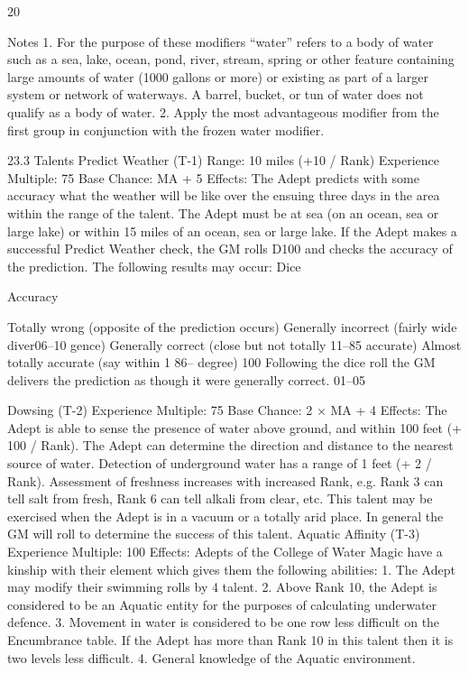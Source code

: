 \documentclass[a4paper]{article}
\begin{document}
\begin{multicols}{3}
20

Notes
1. For the purpose of these modifiers “water” refers
to a body of water such as a sea, lake, ocean, pond,
river, stream, spring or other feature containing
large amounts of water (1000 gallons or more) or
existing as part of a larger system or network of
waterways. A barrel, bucket, or tun of water does
not qualify as a body of water.
2. Apply the most advantageous modifier from the
first group in conjunction with the frozen water
modifier.

23.3 Talents
Predict Weather (T-1)
Range: 10 miles (+10 / Rank)
Experience Multiple: 75
Base Chance: MA + 5%
Effects: The Adept predicts with some accuracy
what the weather will be like over the ensuing
three days in the area within the range of the talent.
The Adept must be at sea (on an ocean, sea or large
lake) or within 15 miles of an ocean, sea or large
lake. If the Adept makes a successful Predict
Weather check, the GM rolls D100 and checks the
accuracy of the prediction. The following results
may occur:
Dice

Accuracy

Totally wrong (opposite of the prediction
occurs)
Generally incorrect (fairly wide diver06–10
gence)
Generally correct (close but not totally
11–85
accurate)
Almost totally accurate (say within 1
86–
degree)
100
Following the dice roll the GM delivers the prediction as though it were generally correct.
01–05

Dowsing (T-2)
Experience Multiple: 75
Base Chance: 2 × MA + 4%
Effects: The Adept is able to sense the presence of
water above ground, and within 100 feet (+ 100 /
Rank). The Adept can determine the direction and
distance to the nearest source of water. Detection
of underground water has a range of 1 feet (+ 2 /
Rank). Assessment of freshness increases with
increased Rank, e.g. Rank 3 can tell salt from
fresh, Rank 6 can tell alkali from clear, etc. This
talent may be exercised when the Adept is in a
vacuum or a totally arid place. In general the GM
will roll to determine the success of this talent.
Aquatic Affinity (T-3)
Experience Multiple: 100
Effects: Adepts of the College of Water Magic
have a kinship with their element which gives them
the following abilities:
1. The Adept may modify their swimming rolls by
4%
talent.
2. Above Rank 10, the Adept is considered to be an
Aquatic entity for the purposes of calculating underwater defence.
3. Movement in water is considered to be one row
less difficult on the Encumbrance table. If the
Adept has more than Rank 10 in this talent then it
is two levels less difficult.
4. General knowledge of the Aquatic environment.


\end{multicols}
\end{document}
